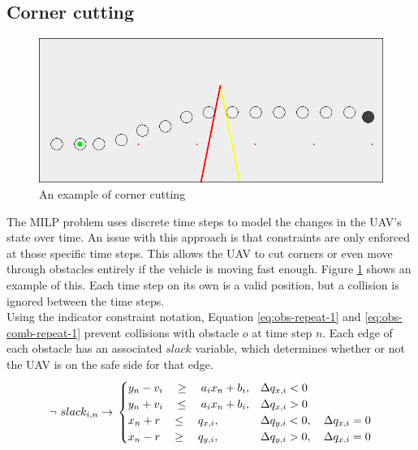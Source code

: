 \subsection{Corner cutting}
\label{subsec:corner-cutting}
\begin{figure}
\includegraphics[width=\textwidth]{img/cornercut_bad}
\caption{An example of corner cutting}
\label{fig:cornercut-example}
\end{figure}
The MILP problem uses discrete time steps to model the changes in the UAV's state over time. An issue with this approach is that constraints are only enforced at those specific time steps. This allows the UAV to cut corners or even move through obstacles entirely if the vehicle is moving fast enough. Figure \ref{fig:cornercut-example} shows an example of this. Each time step on its own is a valid position, but a collision is ignored between the time steps.\\
Using the indicator constraint notation, Equation \ref{eq:obs-repeat-1} and \ref{eq:obs-comb-repeat-1} prevent collisions with obstacle $o$ at time step $n$. Each edge of each obstacle has an associated $slack$ variable, which determines whether or not the UAV is on the safe side for that edge.
\begin{equation}
\label{eq:obs-repeat-1}
\neg ~ slack_{i,n} \rightarrow \\
\begin{cases}
y_{n} -  v_i \quad \geq 
\quad a_{i} x_{n} + b_{i},  	
& \Delta q_{x,i} < 0 							 	
 \\
y_{n} + v_i \quad \leq 
\quad a_{i} x_{n} + b_{i},
& \Delta q_{x,i} > 0 							 	
 \\
x_{n} + r \quad \leq
\quad  q_{x,i}, 		
& \Delta q_{y,i} < 0, \quad \Delta q_{x,i} = 0 	
 \\
x_{n} - r \quad \geq 
\quad q_{y,i},  		
& \Delta q_{y,i} > 0, \quad \Delta q_{x,i} = 0 	
\end{cases}
\end{equation}
